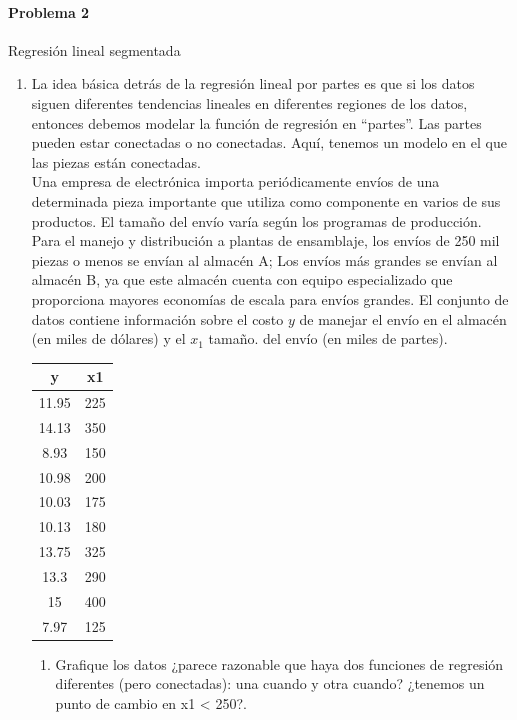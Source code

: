 \documentclass[12pt,a4paper]{report}
\begin{document}
\newpage



\paragraph{Problema 2} Regresión lineal segmentada

\begin{enumerate}
\item 	La idea básica detrás de la regresión lineal por partes es que si los datos siguen diferentes tendencias lineales
en diferentes regiones de los datos, entonces debemos modelar la función de regresión en “partes”. Las partes pueden estar conectadas o no conectadas. Aquí, tenemos un modelo en el que las piezas están conectadas.\\
Una empresa de electrónica importa periódicamente envíos de una determinada pieza importante que utiliza como componente en varios de sus productos. El tamaño del envío varía según los programas de producción.
Para el manejo y distribución a plantas de ensamblaje, los envíos de 250 mil piezas o menos se envían
al almacén A; Los envíos más grandes se envían al almacén B, ya que este almacén cuenta con equipo
especializado que proporciona mayores economías de escala para envíos grandes.
El conjunto de datos contiene información sobre el costo $y$ de manejar el envío en el almacén (en miles de dólares) y el $x_1$ tamaño. del envío (en miles de partes).
\\	

\begin{tabular}{| c | c |}
\hline
y&	x1\\ \hline
11.95&	225\\
14.13&	350\\
8.93&	150\\
10.98&	200\\
10.03&	175\\
10.13&	180\\
13.75&	325\\
13.3&	290\\
15&	400\\
7.97&	125\\
\hline
\end{tabular}

\begin{enumerate}
\item Grafique los datos ¿parece razonable que haya dos funciones de regresión diferentes (pero conectadas): una cuando y otra cuando? ¿tenemos un punto de cambio en x1 < 250?.\\


\end{enumerate}
\end{enumerate}
\end{document}
